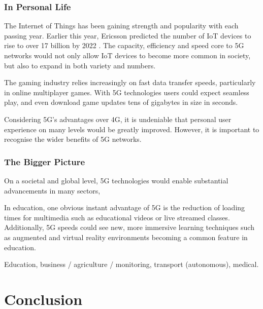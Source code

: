 \documentclass[journal]{IEEEtran}
\begin{document}
\subsubsection{In Personal Life}
The Internet of Things has been gaining strength and popularity with each passing year. Earlier this year, Ericsson predicted the number of IoT devices to rise to over 17 billion by 2022 \cite{ericssondev}. The capacity, efficiency and speed core to 5G networks would not only allow IoT devices to become more common in society, but also to expand in both variety and numbers.

The gaming industry relies increasingly on fast data transfer speeds, particularly in online multiplayer games. With 5G technologies users could expect seamless play, and even download game updates tens of gigabytes in size in seconds.

Considering 5G's advantages over 4G, it is undeniable that personal user experience on many levels would be greatly improved. However, it is important to recognise the wider benefits of 5G networks.

\subsubsection{The Bigger Picture}
On a societal and global level, 5G technologies would enable substantial advancements in many sectors,

In education, one obvious instant advantage of 5G is the reduction of loading times for multimedia such as educational videos or live streamed classes. Additionally, 5G speeds could see new, more immersive learning techniques such as augmented and virtual reality environments becoming a common feature in education.


Education, business / agriculture / monitoring, transport (autonomous), medical.


\section{Conclusion}

\printbibliography
\end{document}
